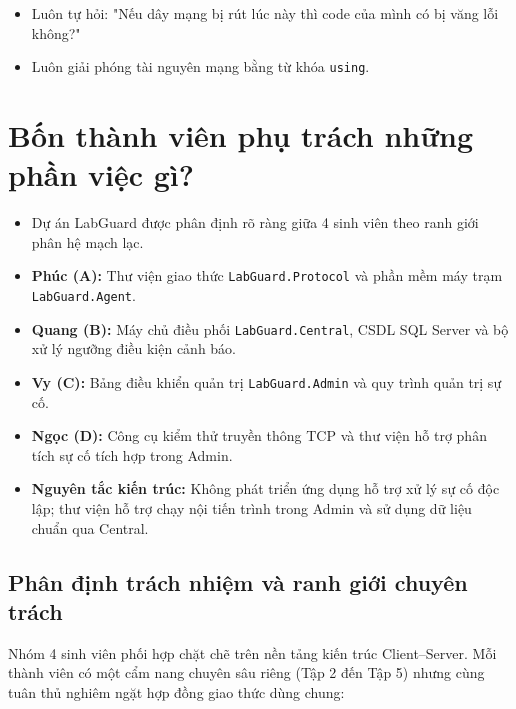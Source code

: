 \documentclass[12pt,a4paper]{article}
\begin{document}
\begin{takeawaybox}
\begin{itemize}[leftmargin=1.5em, itemsep=1pt]
  \item Luôn tự hỏi: "Nếu dây mạng bị rút lúc này thì code của mình có bị văng lỗi không?"
  \item Luôn giải phóng tài nguyên mạng bằng từ khóa \texttt{using}.
\end{itemize}
\end{takeawaybox}

\section{Bốn thành viên phụ trách những phần việc gì?}

\begin{summarybox}
\begin{itemize}[leftmargin=1.5em, itemsep=1pt]
  \item Dự án LabGuard được phân định rõ ràng giữa 4 sinh viên theo ranh giới phân hệ mạch lạc.
  \item \textbf{Phúc (A):} Thư viện giao thức \texttt{LabGuard.Protocol} và phần mềm máy trạm \texttt{LabGuard.Agent}.
  \item \textbf{Quang (B):} Máy chủ điều phối \texttt{LabGuard.Central}, CSDL SQL Server và bộ xử lý ngưỡng điều kiện cảnh báo.
  \item \textbf{Vy (C):} Bảng điều khiển quản trị \texttt{LabGuard.Admin} và quy trình quản trị sự cố.
  \item \textbf{Ngọc (D):} Công cụ kiểm thử truyền thông TCP và thư viện hỗ trợ phân tích sự cố tích hợp trong Admin.
  \item \textbf{Nguyên tắc kiến trúc:} Không phát triển ứng dụng hỗ trợ xử lý sự cố độc lập; thư viện hỗ trợ chạy nội tiến trình trong Admin và sử dụng dữ liệu chuẩn qua Central.
\end{itemize}
\end{summarybox}

\subsection{Phân định trách nhiệm và ranh giới chuyên trách}

Nhóm 4 sinh viên phối hợp chặt chẽ trên nền tảng kiến trúc Client--Server. Mỗi thành viên có một cẩm nang chuyên sâu riêng (Tập 2 đến Tập 5) nhưng cùng tuân thủ nghiêm ngặt hợp đồng giao thức dùng chung:
\end{document}
